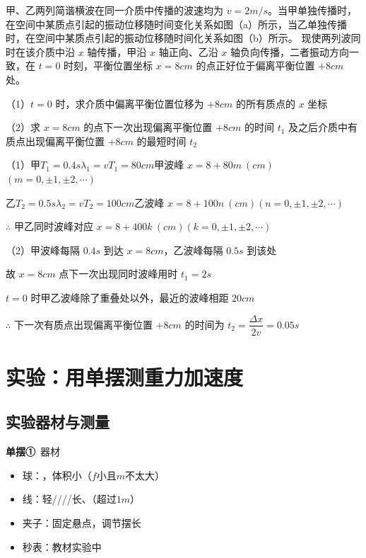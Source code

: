 \begin{problem}[19.（6分）]
甲、乙两列简谐横波在同一介质中传播的波速均为 $v=2\unit{m/s}$。当甲单独传播时，在空间中某质点引起的振动位移随时间变化关系如图（a）所示，当乙单独传播时，在空间中某质点引起的振动位移随时间化关系如图（b）所示。%
现使两列波同时在该介质中沿 $x$ 轴传播，甲沿 $x$ 轴正向、乙沿 $x$ 轴负向传播，二者振动方向一致，在 $t=0$ 时刻，平衡位置坐标 $x=8\unit{cm}$ 的点正好位于偏离平衡位置 $+8\unit{cm}$ 处。

（1）$t=0$ 时，求介质中偏离平衡位置位移为 $+8\unit{cm}$ 的所有质点的 $x$ 坐标

（2）求 $x=8\unit{cm}$ 的点下一次出现偏离平衡位置 $+8\unit{cm}$ 的时间 $t_1$ 及之后介质中有质点出现偏离平衡位置 $+8\unit{cm}$ 的最短时间 $t_2$

\begin{solution}

（1）甲\quad $T_1=0.4\unit{s}$\quad $\lambda_1=vT_1=80\unit{cm}$\quad 甲波峰 $x=8+80m\ (\unit{cm})$\quad $(m=0,\pm1,\pm2,\cdots)$

\hspace{1.6em}乙\quad $T_2=0.5\unit{s}$\quad $\lambda_2=vT_2=100\unit{cm}$\quad 乙波峰 $x=8+100n\ (\unit{cm})$\quad $(n=0,\pm1,\pm2,\cdots)$

\hspace{1.6em}$\therefore$ 甲乙同时波峰对应 $x=8+400k\ (\unit{cm})$\quad $(k=0,\pm1,\pm2,\cdots)$

（2）甲波峰每隔 $0.4\unit{s}$ 到达 $x=8\unit{cm}$，乙波峰每隔 $0.5\unit{s}$ 到该处

\hspace{1.6em}故 $x=8\unit{cm}$ 点下一次出现同时波峰用时 $t_1=2\unit{s}$

\hspace{1.6em}$t=0$ 时甲乙波峰除了重叠处以外，最近的波峰相距 $20\unit{cm}$

\hspace{1.6em}$\therefore$ 下一次有质点出现偏离平衡位置 $+8\unit{cm}$ 的时间为 $t_2=\dfrac{\Delta x}{2v}=0.05\unit{s}$
\end{solution}
\end{problem}


\section{实验：用单摆测重力加速度}
\subsection{实验器材与测量}
\textbf{单摆}\quad\textbf{①}\ 器材
\begin{itemize}
\item 球：，体积小\quad（$f$小且$m$不太大）
\item 线：轻////长、（超过$1\unit{m}$）
\item 夹子：固定悬点，调节摆长
\item 秒表：教材实验中\ 
\end{itemize}

